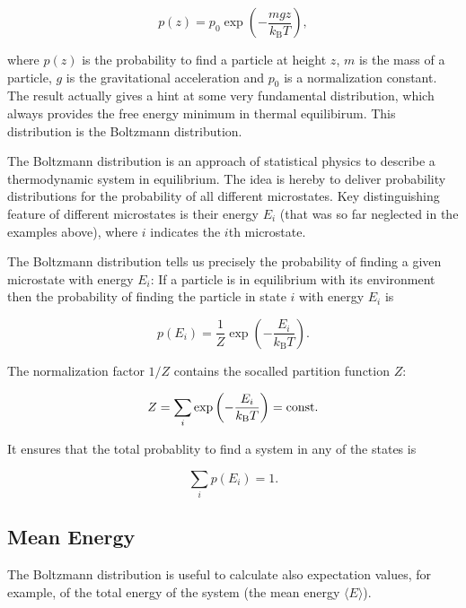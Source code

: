 \documentclass[letterpaper,10pt,english]{sphinxmanual}
\begin{document}
\sphinxAtStartPar
\begin{equation}
p(z)=p_0\exp\left ( -\frac{m g z}{k_\mathrm{B} T}\right ),
\end{equation}

\sphinxAtStartPar
where \(p(z)\) is the probability to find a particle at height \(z\), \(m\) is the mass of a particle, \(g\) is the gravitational acceleration and \(p_0\) is a normalization constant. The result actually gives a hint at some very fundamental distribution, which always provides the free energy minimum in thermal equilibirum. This distribution is the Boltzmann distribution.

\sphinxAtStartPar
The Boltzmann distribution is an approach of statistical physics to describe a thermodynamic system in equilibrium. The idea is hereby to deliver probability distributions for the probability of all different microstates. Key distinguishing feature of different microstates is their energy \(E_i\) (that was so far neglected in the examples above), where \(i\) indicates the \(i\)th microstate.

\sphinxAtStartPar
The Boltzmann distribution tells us precisely the probability of finding a given microstate with energy \(E_i\): If a particle is in equilibrium with its environment then the probability of finding the particle in state \(i\) with energy \(E_i\) is

\sphinxAtStartPar
\begin{equation}
p(E_i)=\frac{1}{Z}\exp\left ( -\frac{E_i}{k_\mathrm{B} T}\right ).
\end{equation}

\sphinxAtStartPar
The normalization factor \(1/Z\) contains the so\sphinxhyphen{}called partition function \(Z\):

\sphinxAtStartPar
\begin{equation}
Z=\sum_{i}\exp\left ( -\frac{E_i}{k_\mathrm{B} T}\right )={\rm const}.
\end{equation}

\sphinxAtStartPar
It ensures that the total probablity to find a system in any of the states is

\sphinxAtStartPar
\begin{equation}
\sum_i p(E_i)=1.
\end{equation}


\subsection{Mean Energy}
\label{\detokenize{notebooks/L2/3_Statistical_Physics_Definitions:Mean-Energy}}
\sphinxAtStartPar
The Boltzmann distribution is useful to calculate also expectation values, for example, of the total energy of the system (the mean energy \(\langle E\rangle\)).
\end{document}
